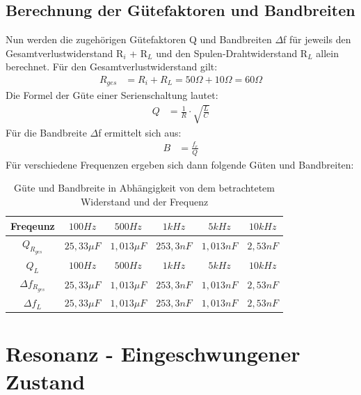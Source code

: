 \documentclass{article}
\begin{document}
\subsection{Berechnung der Gütefaktoren und Bandbreiten}
Nun werden die zugehörigen Gütefaktoren Q und Bandbreiten $\Delta$f für jeweils den Gesamtverlustwiderstand R$_i$ + R$_L$ und den Spulen-Drahtwiderstand R$_L$ allein berechnet.
Für den Gesamtverlustwiderstand gilt:
\begin{align*}
  R_{ges} & = R_i + R_L= 50\Omega + 10\Omega = 60\Omega
\end{align*}
Die Formel der Güte einer Serienschaltung lautet:
\begin{align*}
  Q & = \frac{1}{R}\cdot\sqrt{\frac{L}{C}}
\end{align*}
Für die Bandbreite $\Delta$f ermittelt sich aus:
\begin{align*}
  B & = \frac{f_r}{Q}
\end{align*}
Für verschiedene Frequenzen ergeben sich dann folgende Güten und Bandbreiten:
\begin{table}[h]

  \begin{center}

    \begin{tabular}{|c|c|c|c|c|c|}
      \hline
      Freqeunz             & $100 Hz$     & $500Hz$      & $1kHz$    & $5kHz$    & $10kHz$  \\
      \hline
      $Q_{R_{ges}}$        & $25,33\mu F$ & $1,013\mu F$ & $253,3nF$ & $1,013nF$ & $2,53nF$ \\
      \hline
      $Q_L$                & $100 Hz$     & $500Hz$      & $1kHz$    & $5kHz$    & $10kHz$  \\
      \hline
      $\Delta f_{R_{ges}}$ & $25,33\mu F$ & $1,013\mu F$ & $253,3nF$ & $1,013nF$ & $2,53nF$ \\
      \hline
      $\Delta f_L$         & $25,33\mu F$ & $1,013\mu F$ & $253,3nF$ & $1,013nF$ & $2,53nF$ \\
      \hline
    \end{tabular}
    \caption{Güte und Bandbreite in Abhängigkeit von dem betrachtetem Widerstand und der Frequenz}
    \label{tab:cGB}
  \end{center}
\end{table}



\newpage

\section{Resonanz - Eingeschwungener Zustand}
\end{document}
